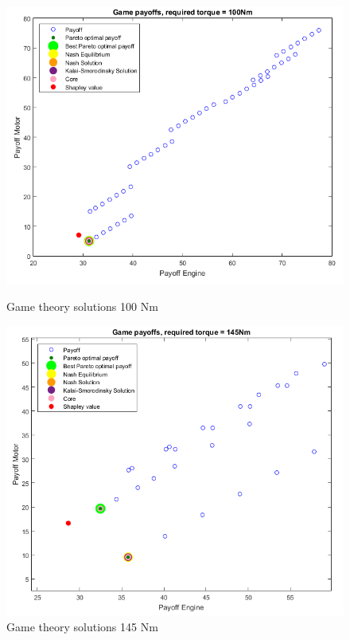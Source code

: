\begin{figure}[h]
\centering
\begin{minipage}{.5\textwidth}
 	\centering
	\includegraphics[scale=0.406]{figures/gametheory/100nm}
	\caption{Game theory solutions 100 Nm}
	\label{fig:100nm}
\end{minipage}%
\begin{minipage}{.5\textwidth}
  	\centering
	\includegraphics[scale=0.385]{figures/gametheory/145nm}
  	\caption{Game theory solutions 145 Nm}
  	\label{fig:145nm}
\end{minipage}
\end{figure}

